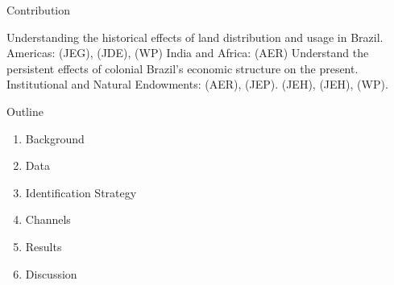 \documentclass[aspectratio=1610]{beamer}
\begin{document}
\begin{frame}{Contribution}
    \begin{outline}
        \1 Understanding the historical effects of land distribution and usage in Brazil.
        \vspace{2mm}
            \2 Americas: 
            \cite{Wigton-Jones2020-ex} (JEG),
            \cite{Sellars2018-yp} (JDE),
            \cite{Smith2023-ip} (WP)
            \vspace{2mm}
            \2 India and Africa: 
            \cites{Banerjee2005-ki} (AER)
        \vspace{2mm}
        \1 Understand the persistent effects of colonial Brazil's economic structure on the present.
        \vspace{2mm}
        \2 Institutional and Natural Endowments: 
        \cite{Acemoglu2001-dz} (AER), 
        \cite{Sokoloff2000-mb} (JEP).
        \vspace{2mm}
        \2 
        \cite{Naritomi2012-or} (JEH), 
        \cite{Musacchio2014-pq} (JEH),
        \cite{Laudares2022-vy} (WP). 
    \end{outline}
\end{frame}

\begin{frame}{Outline}
    \begin{enumerate}
        \item Background
        \vspace{2mm}
        \item Data
        \vspace{2mm}
        \item Identification Strategy
        \vspace{2mm}
        \item Channels
        \vspace{2mm}
        \item Results
        \vspace{2mm}
        \item Discussion
    \end{enumerate}
\end{frame}
\end{document}
